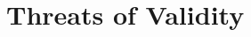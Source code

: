 \documentclass[sigconf]{acmart}
\newcommand{\projName}{HoarePrompt\xspace}
\begin{document}



\section{Threats of Validity}
\label{sec:threats}
\end{document}
